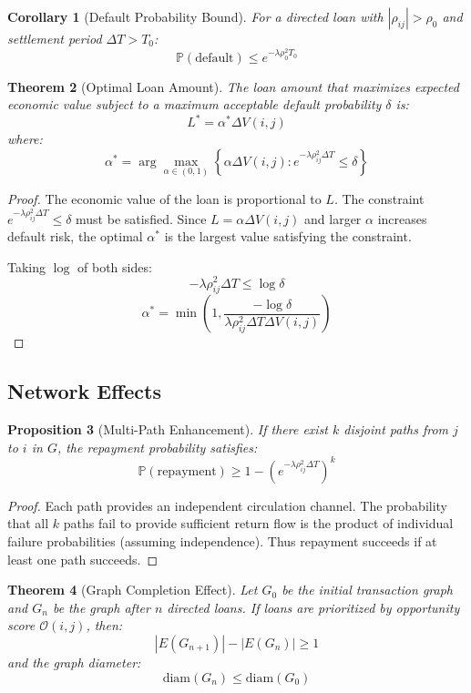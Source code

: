 \documentclass[12pt]{article}
\newtheorem{theorem}{Theorem}
\newtheorem{proposition}[theorem]{Proposition}
\newtheorem{corollary}[theorem]{Corollary}
\begin{document}
\begin{corollary}[Default Probability Bound]
For a directed loan with $|\rho_{ij}| > \rho_0$ and settlement period $\Delta T > T_0$:
$$
\mathbb{P}(\text{default}) \leq e^{-\lambda \rho_0^2 T_0}
$$
\end{corollary}

\begin{theorem}[Optimal Loan Amount]
The loan amount that maximizes expected economic value subject to a maximum acceptable default probability $\delta$ is:
$$
L^* = \alpha^* \Delta V(i,j)
$$
where:
$$
\alpha^* = \arg\max_{\alpha \in (0,1)} \left\{ \alpha \Delta V(i,j) : e^{-\lambda \rho_{ij}^2 \Delta T} \leq \delta \right\}
$$
\end{theorem}

\begin{proof}
The economic value of the loan is proportional to $L$. The constraint $e^{-\lambda \rho_{ij}^2 \Delta T} \leq \delta$ must be satisfied. Since $L = \alpha \Delta V(i,j)$ and larger $\alpha$ increases default risk, the optimal $\alpha^*$ is the largest value satisfying the constraint.

Taking $\log$ of both sides:
$$
-\lambda \rho_{ij}^2 \Delta T \leq \log \delta
$$
$$
\alpha^* = \min\left(1, \frac{-\log \delta}{\lambda \rho_{ij}^2 \Delta T \Delta V(i,j)}\right)
$$
\end{proof}

\subsection{Network Effects}

\begin{proposition}[Multi-Path Enhancement]
If there exist $k$ disjoint paths from $j$ to $i$ in $G$, the repayment probability satisfies:
$$
\mathbb{P}(\text{repayment}) \geq 1 - \left(e^{-\lambda \rho_{ij}^2 \Delta T}\right)^k
$$
\end{proposition}

\begin{proof}
Each path provides an independent circulation channel. The probability that all $k$ paths fail to provide sufficient return flow is the product of individual failure probabilities (assuming independence). Thus repayment succeeds if at least one path succeeds.
\end{proof}

\begin{theorem}[Graph Completion Effect]
Let $G_0$ be the initial transaction graph and $G_n$ be the graph after $n$ directed loans. If loans are prioritized by opportunity score $\mathcal{O}(i,j)$, then:
$$
|E(G_{n+1})| - |E(G_n)| \geq 1
$$
and the graph diameter:
$$
\text{diam}(G_n) \leq \text{diam}(G_0)
$$
\end{theorem}
\end{document}
